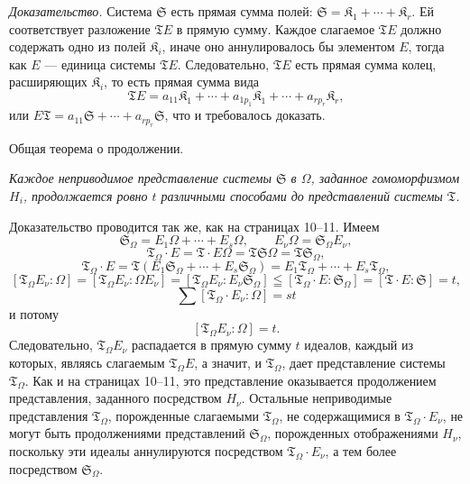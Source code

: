 \documentclass[11pt]{article}
\begin{document}
\emph{Доказательство.} Система \(\mathfrak S\) есть прямая сумма полей: \(\mathfrak S=\mathfrak K_1+\cdots+\mathfrak K_r\). Ей соответствует разложение \(\mathfrak T E\) в прямую сумму. Каждое слагаемое \(\mathfrak T E\) должно содержать одно из полей \(\mathfrak K_i\), иначе оно аннулировалось бы элементом \(E\), тогда как \(E\) --- единица системы \(\mathfrak T E\). Следовательно, \(\mathfrak T E\) есть прямая сумма колец, расширяющих \(\mathfrak K_i\), то есть прямая сумма вида
\[
\mathfrak T E=a_{11}\mathfrak K_1+\cdots+a_{1p_1}\mathfrak K_1+\cdots+a_{rp_r}\mathfrak K_r,
\]
или \(E\mathfrak T=a_{11}\mathfrak S+\cdots+a_{rp_r}\mathfrak S\), что и требовалось доказать.

\begin{center}
Общая теорема о продолжении.
\end{center}

\emph{Каждое неприводимое представление системы \(\mathfrak S\) в \(\Omega\), заданное гомоморфизмом \(H_i\), продолжается ровно \(t\) различными способами до представлений системы \(\mathfrak T\).}

Доказательство проводится так же, как на страницах 10--11. Имеем
\[
\mathfrak S_\Omega=E_1\Omega+\cdots+E_s\Omega,\qquad
E_\nu\Omega=\mathfrak S_\Omega E_\nu,
\]
\[
\mathfrak T_\Omega\cdot E=\mathfrak T\cdot E\Omega
=\mathfrak T\mathfrak S\Omega=\mathfrak T\mathfrak S_\Omega,
\]
\[
\mathfrak T_\Omega\cdot E
=\mathfrak T(E_1\mathfrak S_\Omega+\cdots+E_s\mathfrak S_\Omega)
=E_1\mathfrak T_\Omega+\cdots+E_s\mathfrak T_\Omega,
\]
\[
[\mathfrak T_\Omega E_\nu:\Omega]
=[\mathfrak T_\Omega E_\nu:\Omega E_\nu]
=[\mathfrak T_\Omega E_\nu:E_\nu\mathfrak S_\Omega]
\leqq[\mathfrak T_\Omega\cdot E:\mathfrak S_\Omega]
=[\mathfrak T\cdot E:\mathfrak S]=t,
\]
\[
\sum[\mathfrak T_\Omega\cdot E_\nu:\Omega]=st
\]
и потому
\[
[\mathfrak T_\Omega E_\nu:\Omega]=t.
\]
Следовательно, \(\mathfrak T_\Omega E_\nu\) распадается в прямую сумму \(t\) идеалов, каждый из которых, являясь слагаемым \(\mathfrak T_\Omega E\), а значит, и \(\mathfrak T_\Omega\), дает представление системы \(\mathfrak T_\Omega\). Как и на страницах 10--11, это представление оказывается продолжением представления, заданного посредством \(H_\nu\). Остальные неприводимые представления \(\mathfrak T_\Omega\), порожденные слагаемыми \(\mathfrak T_\Omega\), не содержащимися в \(\mathfrak T_\Omega\cdot E_\nu\), не могут быть продолжениями представлений \(\mathfrak S_\Omega\), порожденных отображениями \(H_\nu\), поскольку эти идеалы аннулируются посредством \(\mathfrak T_\Omega\cdot E_\nu\), а тем более посредством \(\mathfrak S_\Omega\).
\end{document}

